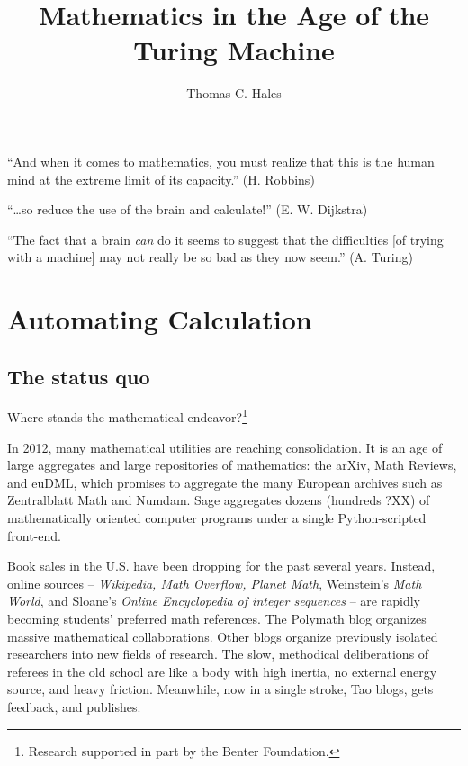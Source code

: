 \documentclass{llncs}
\begin{document}
\title{Mathematics in the Age of the Turing Machine}
\author{Thomas C. Hales}
\maketitle


\section*{}

{

\narrower

\it

``And when it comes to mathematics, you must realize that this is the human mind
at the extreme limit of its capacity.'' (H. Robbins) 

\smallskip
\noindent
``\ldots so reduce the use of
the brain and calculate!'' (E. W. Dijkstra)  

\smallskip
\noindent
``The fact that a brain {\it can} do it seems to suggest that the
difficulties [of trying with a machine] may not really be so bad as they now
seem.''  (A. Turing)

}


\section{Automating Calculation}

\subsection{The status quo}

Where stands the mathematical endeavor?\footnote{Research supported in part by the Benter Foundation.}

In 2012, many mathematical utilities are reaching consolidation.  It
is an age of large aggregates and large repositories of mathematics:
the arXiv, Math Reviews, and euDML, which promises to aggregate the
many European archives such as Zentralblatt Math and Numdam.  Sage
aggregates dozens (hundreds ?XX) of mathematically oriented computer
programs under a single Python-scripted front-end.


Book sales in the U.S. have been dropping  for the past several years. 
Instead, online sources -- {\it Wikipedia, Math Overflow, Planet
  Math}, Weinstein's {\it Math World}, and Sloane's {\it Online
  Encyclopedia of integer sequences} -- are rapidly becoming students'
preferred math references. The Polymath blog organizes massive
mathematical collaborations.  Other blogs organize previously isolated
researchers into new fields of research.  The slow, methodical
deliberations of referees in the old school are like a body with high
inertia, no external energy source, and heavy friction.  Meanwhile,
now in a single stroke,  Tao blogs, gets feedback, and publishes.
\end{document}
